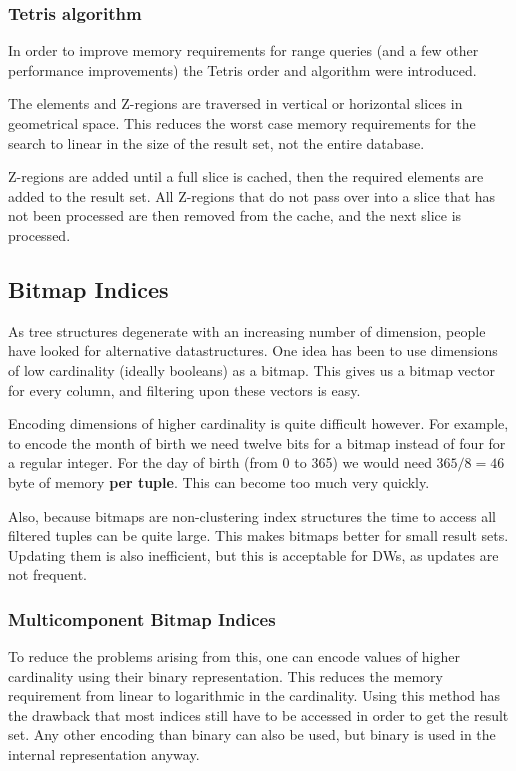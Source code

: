 \documentclass{article}
\begin{document}
\subsubsection{Tetris algorithm}
In order to improve memory requirements for range queries (and a few other performance improvements) the Tetris order and algorithm were introduced.

The elements and Z-regions are traversed in vertical or horizontal slices in geometrical space.
This reduces the worst case memory requirements for the search to linear in the size of the result set, not the entire database.

Z-regions are added until a full slice is cached, then the required elements are added to the result set.
All Z-regions that do not pass over into a slice that has not been processed are then removed from the cache, and the next slice is processed.

\subsection{Bitmap Indices}
As tree structures degenerate with an increasing number of dimension, people have looked for alternative datastructures.
One idea has been to use dimensions of low cardinality (ideally booleans) as a bitmap.
This gives us a bitmap vector for every column, and filtering upon these vectors is easy.

Encoding dimensions of higher cardinality is quite difficult however.
For example, to encode the month of birth we need twelve bits for a bitmap instead of four for a regular integer.
For the day of birth (from 0 to 365) we would need $365/8 = 46$ byte of memory \textbf{per tuple}.
This can become too much very quickly.

Also, because bitmaps are non-clustering index structures the time to access all filtered tuples can be quite large.
This makes bitmaps better for small result sets.
Updating them is also inefficient, but this is acceptable for DWs, as updates are not frequent.

\subsubsection{Multicomponent Bitmap Indices}
To reduce the problems arising from this, one can encode values of higher cardinality using their binary representation.
This reduces the memory requirement from linear to logarithmic in the cardinality.
Using this method has the drawback that most indices still have to be accessed in order to get the result set.
Any other encoding than binary can also be used, but binary is used in the internal representation anyway.
\end{document}
